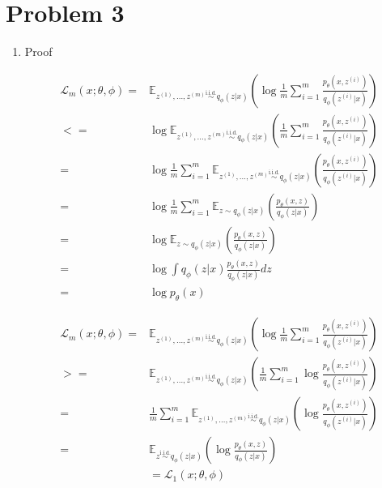 \documentclass[12pt]{article}
\begin{document}
\section*{Problem 3}
\begin{enumerate}
	\item 
	Proof
	
	\begin{equation}
	\begin{split}
	\mathcal{L}_m(x; \theta, \phi) =& \mathbb{E}_{z^{(1)}, \ldots, z^{(m)} \overset{\text{i.i.d.}}{\sim} q_\phi(z|x)} \left(\log \frac{1}{m} \sum_{i=1}^m \frac{p_\theta(x,z^{(i)})}{q_\phi(z^{(i)}|x)} \right) \\
	<=& \log \mathbb{E}_{z^{(1)}, \ldots, z^{(m)} \overset{\text{i.i.d.}}{\sim} q_\phi(z|x)} \left( \frac{1}{m} \sum_{i=1}^m \frac{p_\theta(x,z^{(i)})}{q_\phi(z^{(i)}|x)} \right) \\
	=& \log  \frac{1}{m}  \sum_{i=1}^m \mathbb{E}_{z^{(1)},\ldots, z^{(m)} \overset{\text{i.i.d.}}{\sim} q_\phi(z|x)} \left( \frac{p_\theta(x,z^{(i)})}{q_\phi(z^{(i)}|x)} \right) \\
	=& \log  \frac{1}{m}  \sum_{i=1}^m \mathbb{E}_{z {\sim} q_\phi(z|x)} \left( \frac{p_\theta(x,z)}{q_\phi(z|x)} \right) \\
	=& \log  \mathbb{E}_{z {\sim} q_\phi(z|x)} \left( \frac{p_\theta(x,z)}{q_\phi(z|x)} \right) \\
	=& \log  \int q_\phi(z|x)  \frac{p_\theta(x,z)}{q_\phi(z|x)} dz \\	
	=& \log p_\theta(x)
	\end{split}
	\end{equation}
	
	\begin{equation}
	\begin{split}
	\mathcal{L}_m(x; \theta, \phi) =& \mathbb{E}_{z^{(1)}, \ldots, z^{(m)} \overset{\text{i.i.d.}}{\sim} q_\phi(z|x)} \left(\log \frac{1}{m} \sum_{i=1}^m \frac{p_\theta(x,z^{(i)})}{q_\phi(z^{(i)}|x)} \right) \\
	>=& \mathbb{E}_{z^{(1)}, \ldots, z^{(m)} \overset{\text{i.i.d.}}{\sim} q_\phi(z|x)} \left( \frac{1}{m} \sum_{i=1}^m \log \frac{p_\theta(x,z^{(i)})}{q_\phi(z^{(i)}|x)} \right)  \\
	=& \frac{1}{m} \sum_{i=1}^m  \mathbb{E}_{z^{(1)}, \ldots, z^{(m)} \overset{\text{i.i.d.}}{\sim} q_\phi(z|x)} \left(  \log \frac{p_\theta(x,z^{(i)})}{q_\phi(z^{(i)}|x)} \right) \\
	=&  \mathbb{E}_{z \overset{\text{i.i.d.}}{\sim} q_\phi(z|x)} \left(  \log \frac{p_\theta(x,z)}{q_\phi(z|x)} \right) \\
	&= \mathcal{L}_1(x; \theta, \phi)
	\end{split}
\end{equation}


\end{enumerate}
\end{document}
